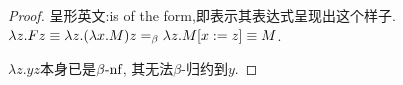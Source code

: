 \begin{proof}
呈形英文:is of the form,即表示其表达式呈现出这个样子.
    $\lambda z.Fz\equiv \lambda z.(\lambda x.M)z=_{\beta} \lambda z.M[x:=z]\equiv M$.
	
	$\lambda z.yz$本身已是$\beta\textrm{-nf}$, 其无法$\beta$-归约到$y$.
\end{proof}
